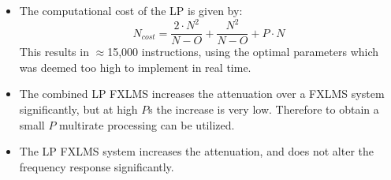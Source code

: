 \large
\begin{itemize}
\item The computational cost of the LP is given by:
	  \begin{equation}
	  N_{cost}=\frac{2\cdot N^2}{N-O}+\frac{N^2}{N-O}+P\cdot N
	  \end{equation}
	  This results in $\approx$15,000 instructions, using the optimal parameters which was deemed too high to implement in real time. \\
\item The combined LP FXLMS increases the attenuation over a FXLMS system significantly, but at high $P$s the increase is very low. 
	  Therefore to obtain a small $P$ multirate processing can be utilized. \\ 
\item The LP FXLMS system increases the attenuation, and does not alter the frequency response significantly.


\end{itemize}

